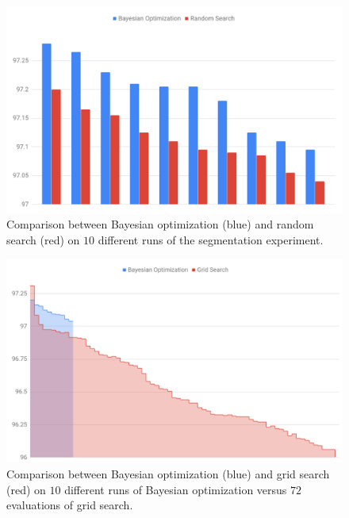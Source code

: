 \begin{figure}
	\begin{center}
		\includegraphics[width=1.0\textwidth]{images/tokenizer-comparison.png}
		\caption{Comparison between Bayesian optimization (blue) and random search (red) on $10$ different runs of the segmentation experiment.}
		\label{figure:tokenizer-comparison}
	\end{center}
\end{figure}

\begin{figure}
	\begin{center}
		\includegraphics[width=1.0\textwidth]{images/tokenizer-bopt-vs-grid.png}
		\caption{Comparison between Bayesian optimization (blue) and grid search (red) on $10$ different runs of Bayesian optimization versus $72$ evaluations of grid search.}
		\label{figure:tokenizer-comparison-bopt-grid-search}
	\end{center}
\end{figure}

